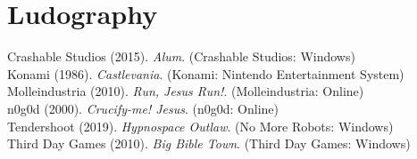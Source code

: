 \section{Ludography}
Crashable Studios (2015). \textit{Alum}. (Crashable Studios: Windows)\\
Konami (1986). \textit{Castlevania}. (Konami: Nintendo Entertainment System)\\
Molleindustria (2010). \textit{Run, Jesus Run!}. (Molleindustria: Online)\\
n0g0d (2000). \textit{Crucify-me! Jesus}. (n0g0d: Online)\\
Tendershoot (2019). \textit{Hypnospace Outlaw}. (No More Robots: Windows)\\
Third Day Games (2010). \textit{Big Bible Town}. (Third Day Games: Windows)
